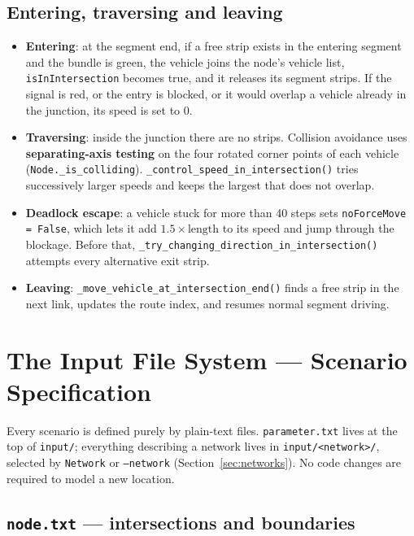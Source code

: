 \documentclass[11pt, a4paper]{article}
\newcommand{\code}[1]{\texttt{#1}}
\begin{document}
\subsection{Entering, traversing and leaving}

\begin{itemize}
    \item \textbf{Entering}: at the segment end, if a free strip exists in the
          entering segment and the bundle is green, the vehicle joins the node's
          vehicle list, \code{isInIntersection} becomes true, and it releases its
          segment strips. If the signal is red, or the entry is blocked, or it
          would overlap a vehicle already in the junction, its speed is set to 0.
    \item \textbf{Traversing}: inside the junction there are no strips. Collision
          avoidance uses \textbf{separating-axis testing} on the four rotated
          corner points of each vehicle (\code{Node.\_is\_colliding}).
          \code{\_control\_speed\_in\_intersection()} tries successively larger
          speeds and keeps the largest that does not overlap.
    \item \textbf{Deadlock escape}: a vehicle stuck for more than 40 steps sets
          \code{noForceMove = False}, which lets it add
          $1.5 \times \text{length}$ to its speed and jump through the blockage.
          Before that, \code{\_try\_changing\_direction\_in\_intersection()}
          attempts every alternative exit strip.
    \item \textbf{Leaving}: \code{\_move\_vehicle\_at\_intersection\_end()} finds
          a free strip in the next link, updates the route index, and resumes
          normal segment driving.
\end{itemize}

\section{The Input File System --- Scenario Specification}
\label{sec:input}

Every scenario is defined purely by plain-text files. \code{parameter.txt} lives
at the top of \code{input/}; everything describing a network lives in
\code{input/<network>/}, selected by \code{Network} or \code{--network}
(Section~\ref{sec:networks}). No code changes are required to model a new
location.

\subsection{\code{node.txt} --- intersections and boundaries}
\end{document}
